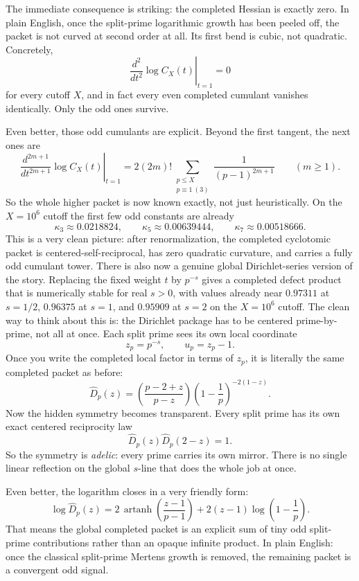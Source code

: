 \documentclass[11pt]{article}
\def\mathcal#1{#1}%
\begin{document}
The immediate consequence is striking: the completed Hessian is exactly zero. In plain English, once the split-prime logarithmic growth has been peeled off, the packet is not curved at second order at all. Its first bend is cubic, not quadratic. Concretely,
\[
\left.\frac{d^2}{dt^2}\log \mathcal C_X(t)\right|_{t=1}=0
\]
for every cutoff $X$, and in fact every even completed cumulant vanishes identically. Only the odd ones survive.

Even better, those odd cumulants are explicit. Beyond the first tangent, the next ones are
\[
\left.\frac{d^{2m+1}}{dt^{2m+1}}\log \mathcal C_X(t)\right|_{t=1}
=2(2m)!\sum_{\substack{p\le X\\ p\equiv1\ (3)}}\frac{1}{(p-1)^{2m+1}}
\qquad (m\ge1).
\]
So the whole higher packet is now known exactly, not just heuristically. On the $X=10^6$ cutoff the first few odd constants are already
\[
\kappa_3\approx0.0218824,
\qquad
\kappa_5\approx0.00639444,
\qquad
\kappa_7\approx0.00518666.
\]
This is a very clean picture: after renormalization, the completed cyclotomic packet is centered-self-reciprocal, has zero quadratic curvature, and carries a fully odd cumulant tower.
There is also now a genuine global Dirichlet-series version of the story. Replacing the fixed weight $t$ by $p^{-s}$ gives a completed defect product that is numerically stable for real $s>0$, with values already near $0.97311$ at $s=1/2$, $0.96375$ at $s=1$, and $0.95909$ at $s=2$ on the $X=10^6$ cutoff.
The clean way to think about this is: the Dirichlet package has to be centered prime-by-prime, not all at once. Each split prime sees its own local coordinate
\[
z_p=p^{-s}, \qquad u_p=z_p-1.
\]
Once you write the completed local factor in terms of $z_p$, it is literally the same completed packet as before:
\[
\widehat D_p(z)=\left(\frac{p-2+z}{p-z}\right)\left(1-\frac1p\right)^{-2(1-z)}.
\]
Now the hidden symmetry becomes transparent. Every split prime has its own exact centered reciprocity law
\[
\widehat D_p(z)\widehat D_p(2-z)=1.
\]
So the symmetry is \emph{adelic}: every prime carries its own mirror. There is no single linear reflection on the global $s$-line that does the whole job at once.

Even better, the logarithm closes in a very friendly form:
\[
\log \widehat D_p(z)
=
2\,\operatorname{artanh}\!\left(\frac{z-1}{p-1}\right)
+2(z-1)\log\!\left(1-\frac1p\right).
\]
That means the global completed packet is an explicit sum of tiny odd split-prime contributions rather than an opaque infinite product. In plain English: once the classical split-prime Mertens growth is removed, the remaining packet is a convergent odd signal.
\end{document}

